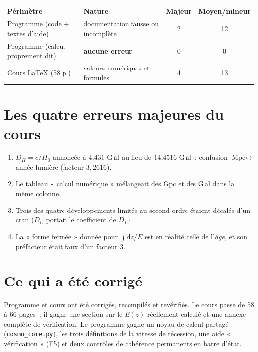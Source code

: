 \documentclass[11pt,a4paper]{report}
\newcommand{\Gly}{\text{G\,al}}
\newcommand{\Mpc}{\text{Mpc}}
\newcommand{\dif}{\mathrm{d}}
\newcommand{\Hzero}{H_{0}}
\newcommand{\avant}[1]{\textcolor{accentred}{#1}}
\newcommand{\apres}[1]{\textcolor{accentsage}{#1}}
\begin{document}
\begin{center}
\renewcommand{\arraystretch}{1.3}
\begin{tabular}{@{}p{5.4cm}p{5.6cm}cc@{}}
\toprule
\textbf{Périmètre} & \textbf{Nature} & \textbf{Majeur} & \textbf{Moyen/mineur} \\
\midrule
Programme (code + textes d'aide) & documentation fausse ou incomplète & 2 & 12 \\
Programme (calcul proprement dit) & \textbf{aucune erreur} & 0 & 0 \\
Cours \LaTeX{} (58 p.) & valeurs numériques et formules & 4 & 13 \\
\bottomrule
\end{tabular}
\end{center}

\section*{Les quatre erreurs majeures du cours}

\begin{enumerate}[topsep=3pt]
\item $D_{H} = c/\Hzero$ annoncée à \avant{$4{,}431~\Gly$} au lieu de
\apres{$14{,}4516~\Gly$}~: confusion $\Mpc \leftrightarrow$ année-lumière
(facteur $3{,}2616$).
\item Le tableau « calcul numérique » mélangeait des Gpc et des G\,al dans la
même colonne.
\item Trois des quatre développements limités au second ordre étaient décalés
d'un cran ($D_{C}$ portait le coefficient de $D_{L}$).
\item La « forme fermée » donnée pour $\int\dif z/E$ est en réalité celle de
l'\emph{âge}, et son préfacteur était faux d'un facteur 3.
\end{enumerate}

\section*{Ce qui a été corrigé}

Programme et cours ont été corrigés, recompilés et revérifiés. Le cours passe
de 58 à 66 pages~; il gagne une section sur le $E(z)$ réellement calculé et une
annexe complète de vérification. Le programme gagne un noyau de calcul partagé
(\texttt{cosmo\_core.py}), les trois définitions de la vitesse de récession, une
aide « vérification » (F5) et deux contrôles de cohérence permanents en barre
d'état.

\end{document}
